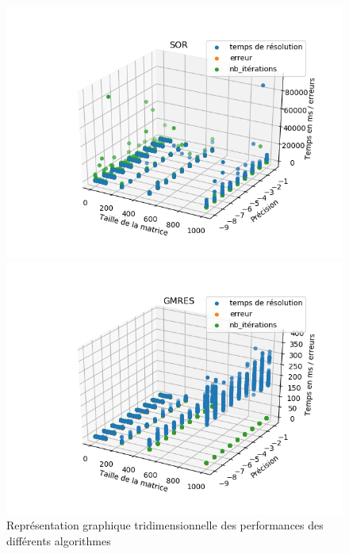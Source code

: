 \begin{figure}[H]
\begin{minipage}[t]{0.5\linewidth}
	\includegraphics[width=\linewidth]{../codes/Data/sor3D.png}
	\end{minipage}
	\begin{minipage}[t]{0.5\linewidth}
	\includegraphics[width=\linewidth]{../codes/Data/gmres.png}
	\end{minipage}
	\caption{Représentation graphique tridimensionnelle des performances des différents algorithmes}
\end{figure}





